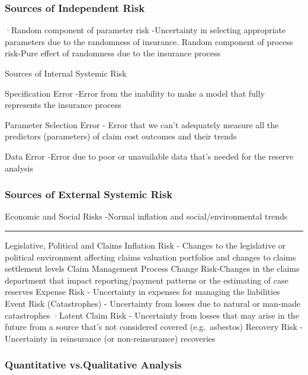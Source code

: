 \documentclass[
]{article}
\begin{document}
\subsubsection{Sources of Independent
Risk}\label{sources-of-independent-risk}

·Random component of parameter risk -Uncertainty in selecting
appropriate parameters due to the randomness of insurance. Random
component of process risk-Pure effect of randomness due to the insurance
process

Sources of Internal Systemic Risk

Specification Error -Error from the inability to make a model that fully
represents the insurance process

Parameter Selection Error - Error that we can't adequately measure all
the predictors (parameters) of claim cost outcomes and their trends

Data Error -Error due to poor or unavailable data that's needed for the
reserve analysis

\subsubsection{Sources of External Systemic
Risk}\label{sources-of-external-systemic-risk}

Economic and Social Risks -Normal inflation and social/environmental
trends

\begin{center}\rule{0.5\linewidth}{0.5pt}\end{center}

Legislative, Political and Claims Inflation Risk - Changes to the
legislative or political environment affecting claims valuation
portfolios and changes to claims settlement levels Claim Management
Process Change Risk-Changes in the claims department that impact
reporting/payment patterns or the estimating of case reserves Expense
Risk - Uncertainty in expenses for managing the liabilities Event Risk
(Catastrophes) - Uncertainty from losses due to natural or man-made
catastrophes ·Latent Claim Risk - Uncertainty from losses that may arise
in the future from a source that's not considered covered
(e.g.~asbestos) Recovery Risk - Uncertainty in reinsurance (or
non-reinsurance) recoveries

\subsubsection{Quantitative vs.Qualitative
Analysis}\label{quantitative-vs.qualitative-analysis}
\end{document}

